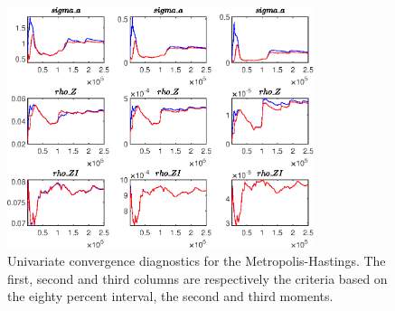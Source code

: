 \begin{figure}[H]
\centering 
\includegraphics[width=0.80\textwidth]{two_sector_RBC_differentiated_est/Output/two_sector_RBC_differentiated_est_udiag3}
\caption{Univariate convergence diagnostics for the Metropolis-Hastings.
The first, second and third columns are respectively the criteria based on
the eighty percent interval, the second and third moments.}\label{Fig:UnivariateDiagnostics:3}
\end{figure}

